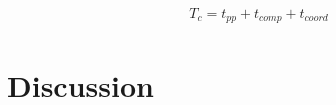 \documentclass[conference,final]{IEEEtran}
\newcommand{\tc }{ $T_c$ }
\newcommand{\upp}{\vspace*{-0.5em}}
\begin{document}
\vspace{-1em}
\begin{eqnarray}
T_c = t_{pp} + t_{comp} + t_{coord}
\end{eqnarray}





\section{Discussion}
\end{document}
